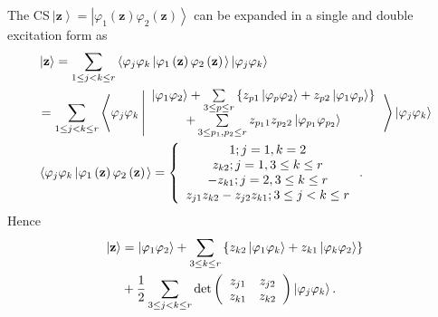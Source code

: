 \documentclass[aps,preprint]{revtex4}%
\begin{document}
The CS$\ \left\vert \mathbf{z}\right\rangle =\left\vert \varphi_{1}\left(
\mathbf{z}\right)  \varphi_{2}\left(  \mathbf{z}\right)  \right\rangle $ can
be expanded in a single and double excitation form as
\begin{align}
&  \left\vert \mathbf{z}\right\rangle =\sum_{1\leq j<k\leq r}\left\langle
\varphi_{j}\varphi_{k}\left\vert \varphi_{1}\left(  \mathbf{z}\right)
\varphi_{2}\left(  \mathbf{z}\right)  \right.  \right\rangle \left\vert
\varphi_{j}\varphi_{k}\right\rangle \nonumber\\
&  \left.  =\right.  \sum_{1\leq j<k\leq r}\left\langle \varphi_{j}\varphi
_{k}\left\vert
\begin{array}
[c]{c}%
\left\vert \varphi_{1}\varphi_{2}\right\rangle +\sum\limits_{3\leq p\leq
r}\left\{  z_{p1}\left\vert \varphi_{p}\varphi_{2}\right\rangle +z_{p2}%
\left\vert \varphi_{1}\varphi_{p}\right\rangle \right\} \\
+\sum\limits_{3\leq p_{1},p_{2}\leq r}z_{p_{1}1}z_{p_{2}2}\left\vert
\varphi_{p_{1}}\varphi_{p_{2}}\right\rangle
\end{array}
\right.  \right\rangle \left\vert \varphi_{j}\varphi_{k}\right\rangle \\
&  \left\langle \varphi_{j}\varphi_{k}\left\vert \varphi_{1}\left(
\mathbf{z}\right)  \varphi_{2}\left(  \mathbf{z}\right)  \right.
\right\rangle =\left\{
\begin{array}
[c]{c}%
1;j=1,k=2\\
z_{k2};j=1,3\leq k\leq r\\
-z_{k1};j=2,3\leq k\leq r\\
z_{j1}z_{k2}-z_{j2}z_{k1};3\leq j<k\leq r
\end{array}
\right.  .
\end{align}
Hence%
\begin{align}
\left\vert \mathbf{z}\right\rangle  &  =\left\vert \varphi_{1}\varphi
_{2}\right\rangle +\sum\limits_{3\leq k\leq r}\left\{  z_{k2}\left\vert
\varphi_{1}\varphi_{k}\right\rangle +z_{k1}\left\vert \varphi_{k}\varphi
_{2}\right\rangle \right\} \nonumber\\
&  +\frac{1}{2}\sum_{3\leq j<k\leq r}\det\left(
\begin{array}
[c]{cc}%
z_{j1} & z_{j2}\\
z_{k1} & z_{k2}%
\end{array}
\right)  \left\vert \varphi_{j}\varphi_{k}\right\rangle .
\end{align}
\end{document}
